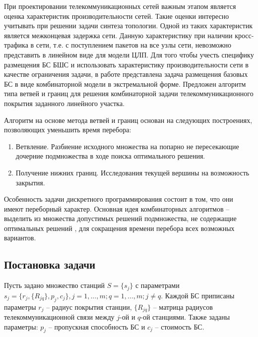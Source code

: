 При проектировании телекоммуникационных сетей важным этапом является оценка характеристик производительности сетей. Такие оценки интересно учитывать при решении задачи синтеза топологии. Одной из таких характеристик является межконцевая задержка сети. Данную характеристику при наличии кросс-трафика в сети, т.е. с поступлением пакетов на все узлы сети, невозможно представить в линейном виде для модели ЦЛП. Для того чтобы учесть специфику размещения БС БШС и использовать характеристику производительности сети в качестве ограничения задачи, в работе  представлена задача размещения базовых БС в виде комбинаторной модели в экстремальной форме. Предложен алгоритм типа ветвей и границ для решения комбинаторной задачи телекоммуникационного покрытия заданного линейного участка.

Алгоритм на основе метода ветвей и границ основан на следующих построениях, позволяющих уменьшить время перебора:

\begin{enumerate}
  \item Ветвление. Разбиение исходного множества на попарно не пересекающие дочерние подмножества в ходе поиска оптимального решения.
  \item Получение нижних границ. Исследования текущей вершины на возможность закрытия.
\end{enumerate}

Особенность задачи дискретного программирования состоит в том, что они имеют переборный характер. Основная идея комбинаторных алгоритмов -- выделить из множества допустимых решений подмножества, не содержащие оптимальных решений \cite{SigalBook}, для сокращения времени перебора всех возможных вариантов. 




\subsection{Постановка задачи}

Пусть задано множество станций $S=\{s_j\}$ с параметрами $s_j=\{r_j,\{R_{jq} \},p_j, c_j \},j=1,...,m;q=1,...,m;j \neq q $. Каждой БС приписаны параметры $r_j$ -- радиус покрытия станции, $\{R_{jq} \}$ -- матрица радиусов телекоммуникационной  связи между $j$-ой и $q$-ой станциями. Также заданы параметры: $p_j$ -- пропускная способность БС и $c_j$ -- стоимость БС.


